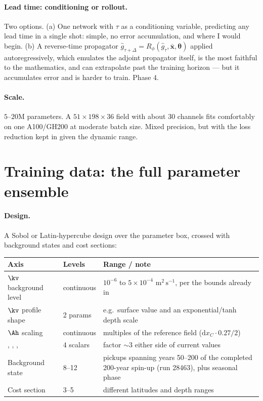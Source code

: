 \paragraph{Lead time: conditioning or rollout.}
Two options. (a) One network with $\tau$ as a conditioning variable, predicting
any lead time in a single shot: simple, no error accumulation, and where I would
begin. (b) A reverse-time propagator
$\hat{g}_{\tau+\Delta}=R_\phi(\hat{g}_\tau,\bar{\mathbf{x}},\boldsymbol{\theta})$
applied autoregressively, which emulates the adjoint propagator itself, is the
most faithful to the mathematics, and can extrapolate past the training
horizon --- but it accumulates error and is harder to train. Phase 4.

\paragraph{Scale.} $5$--$20$M parameters. A $51\times198\times36$ field with
about $30$ channels fits comfortably on one A100/GH200 at moderate batch size.
Mixed precision, but with the loss reduction kept in  given the
dynamic range.

\section{Training data: the full parameter ensemble}
\label{sec:trainingdata}

\paragraph{Design.}
A Sobol or Latin-hypercube design over the parameter box, crossed with
background states and cost sections:

\begin{center}
\begin{tabularx}{\textwidth}{@{}Y{0.85}Y{0.55}Y{1.6}@{}}
\toprule
\textbf{Axis} & \textbf{Levels} & \textbf{Range / note}\\
\midrule
$\kv$ background level & continuous & $10^{-6}$ to $5\times10^{-4}$
  $\mathrm{m^{2}\,s^{-1}}$, per the  bounds already in
  \\
$\kv$ profile shape & 2 params & e.g.\ surface value and an
  exponential/tanh depth scale\\
$\Ah$ scaling & continuous & multiples of the reference
   field ($\mathrm{d}x_C\cdot0.27/2$)\\
, , ,
   & 4 scalars & factor $\sim\!3$ either side of current values\\
Background state & 8--12 & pickups spanning years 50--200 of the completed
  200-year spin-up (run 28463), plus seasonal phase\\
Cost section & 3--5 & different latitudes and depth ranges\\
\bottomrule
\end{tabularx}
\end{center}

